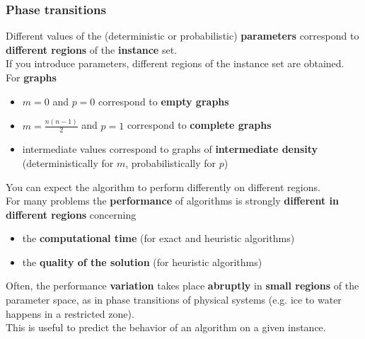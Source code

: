 \documentclass[11pt]{article}
\begin{document}
	\newpage
	
	\subsubsection{Phase transitions}
	Different values of the (deterministic or probabilistic) \textbf{parameters} correspond to \textbf{different regions} of the \textbf{instance} set.\\
	If you introduce parameters, different regions of the instance set are obtained.\\
	
	For \textbf{graphs}
	\begin{itemize}
		\item $m = 0$ and $p = 0$ correspond to \textbf{empty graphs}
		\item $m = \frac{n(n−1)}{2}$ and $p = 1$ correspond to \textbf{complete graphs }
		\item intermediate values correspond to graphs of \textbf{intermediate density} (deterministically for $m$, probabilistically for $p$)
	\end{itemize}
	You can expect the algorithm to perform differently on different regions.\\
	
	For many problems the \textbf{performance} of algorithms is strongly \textbf{different in different regions} concerning
	\begin{itemize}
		\item the \textbf{computational time} (for exact and heuristic algorithms)
		\item the \textbf{quality of the solution} (for heuristic algorithms)
	\end{itemize}
	Often, the performance \textbf{variation} takes place \textbf{abruptly} in \textbf{small regions} of the parameter space, as in phase transitions of physical systems (e.g. ice to water happens in a restricted zone).\\
	This is useful to predict the behavior of an algorithm on a given instance.\\
	
	\newpage
	
\end{document}
